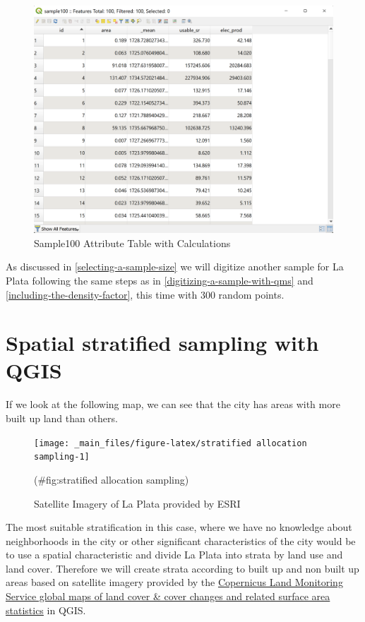 \documentclass[
]{book}
\begin{document}
\begin{figure}

{\centering \includegraphics[width=1\linewidth]{images/sample100} 

}

\caption{Sample100 Attribute Table with Calculations}\label{fig:img-212}
\end{figure}

As discussed in \ref{selecting-a-sample-size} we will digitize another sample for La Plata following the same steps as in \ref{digitizing-a-sample-with-qms} and \ref{including-the-density-factor}, this time with 300 random points.

\hypertarget{spatial-stratified-sampling-with-qgis}{%
\section{Spatial stratified sampling with QGIS}\label{spatial-stratified-sampling-with-qgis}}

If we look at the following map, we can see that the city has areas with more built up land than others.

\begin{figure}

{\centering \texttt{[image: \_main\_files/figure-latex/stratified allocation sampling-1]} 

}

\caption{Satellite Imagery of La Plata provided by ESRI}(\#fig:stratified allocation sampling)
\end{figure}

The most suitable stratification in this case, where we have no knowledge about neighborhoods in the city or other significant characteristics of the city would be to use a spatial characteristic and divide La Plata into strata by land use and land cover. Therefore we will create strata according to built up and non built up areas based on satellite imagery provided by the \href{https://lcviewer.vito.be/about}{Copernicus Land Monitoring Service global maps of land cover \& cover changes and related surface area statistics} in QGIS.
\end{document}
